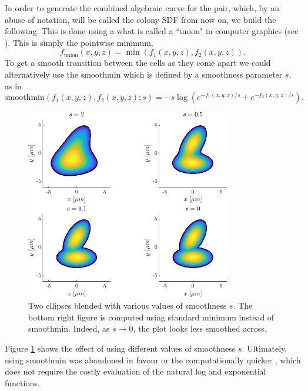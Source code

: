In order to generate 
the combined algebraic curve for the pair, which, by an abuse of notation, will 
be called the colony SDF from now on, we build the following.
This is done using a what is called a ``union" in computer graphics
(see \cite{fusekvisualization}). This is simply the pointwise minimum,
\begin{equation*}
    f_{\textrm{union}}(x,y,z) = \min(f_1(x,y,z), f_2(x,y,z)).
\end{equation*} 
To get a smooth transition between the cells as they come apart we could alternatively use 
the $\textrm{smoothmin}$ which is defined by a smoothness parameter $s$, as in
\begin{equation*}
    \textrm{smoothmin}(f_1(x,y,z), f_2(x,y,z); s) = -s \log(e^{-f_1(x,y,z)/s} + e^{-f_2(x,y,z)/s}).
\end{equation*}
\begin{figure}[!htb]
    \centering
    \includegraphics[width=0.8\textwidth]{chapter2/figures/compareSmoothness.pdf}
    \caption{Two ellipses blended with various values of smoothness $s$. The bottom right 
             figure is computed using standard minimum instead of smoothmin. Indeed,
             as $s \rightarrow 0$, the plot looks less smoothed across.}
    \label{fig:compareSmoothness}
\end{figure}
Figure \ref{fig:compareSmoothness} shows the effect of using different values of smoothness
$s$. Ultimately, using smoothmin was abandoned in favour or the computationally quicker ,
which does not require the costly evaluation of the natural log and exponential functions.
\\

